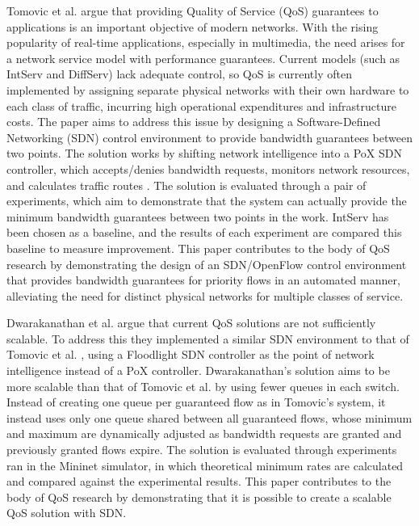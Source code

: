 \documentclass[accepted,single]{gipaper}
\begin{document}
\hspace{10mm} Tomovic et al. \cite{Tomovic:2014} argue that providing Quality of Service (QoS) guarantees to applications is an important objective of modern networks. With the rising popularity of real-time applications, especially in multimedia, the need arises for a network service model with performance guarantees. Current models (such as IntServ and DiffServ) lack adequate control, so QoS is currently often implemented by assigning separate physical networks with their own hardware to each class of traffic, incurring high operational expenditures and infrastructure costs. The paper aims to address this issue by designing a Software-Defined Networking (SDN) control environment to provide bandwidth guarantees between two points. The solution works by shifting network intelligence into a PoX SDN controller, which accepts/denies bandwidth requests, monitors network resources, and calculates traffic routes \cite{Tomovic:2014}. The solution is evaluated through a pair of experiments, which aim to demonstrate that the system can actually provide the minimum bandwidth guarantees between two points in the work. IntServ has been chosen as a baseline, and the results of each experiment are compared this baseline to measure improvement. This paper contributes to the body of QoS research by demonstrating the design of an SDN/OpenFlow control environment that provides bandwidth guarantees for priority flows in an automated manner, alleviating the need for distinct physical networks for multiple classes of service.


\hspace{10mm} Dwarakanathan et al. \cite{Dwara:2015} argue that current QoS solutions are not sufficiently scalable. To address this they implemented a similar SDN environment to that of Tomovic et al. \cite{Tomovic:2014}, using a Floodlight SDN controller as the point of network intelligence instead of a PoX controller. Dwarakanathan's \cite{Dwara:2015} solution aims to be more scalable than that of Tomovic et al. \cite{Tomovic:2014} by using fewer queues in each switch. Instead of creating one queue per guaranteed flow as in Tomovic's \cite{Tomovic:2014} system, it instead uses only one queue shared between all guaranteed flows, whose minimum and maximum are dynamically adjusted as bandwidth requests are granted and previously granted flows expire. The solution is evaluated through experiments ran in the Mininet simulator, in which theoretical minimum rates are calculated and compared against the experimental results. This paper contributes to the body of QoS research by demonstrating that it is possible to create a scalable QoS solution with SDN.
\end{document}
